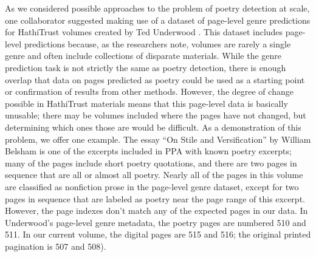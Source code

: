 \documentclass{anthology-ch}         %
\begin{document}
As we considered possible approaches to the problem of poetry detection at scale, one collaborator suggested making use of a dataset of page-level genre predictions for HathiTrust volumes created by Ted Underwood \cite{underwood_page-level_2014}. This dataset includes page-level predictions because, as the researchers note, volumes are rarely a single genre and often include collections of disparate materials. While the genre prediction task is not strictly the same as poetry detection, there is enough overlap that data on pages predicted as poetry could be used as a starting point or confirmation of results from other methods. However, the degree of change possible in HathiTrust materials means that this page-level data is basically unusable; there may be volumes included where the pages have not changed, but determining which ones those are would be difficult. As a demonstration of this problem, we offer one example. The essay “On Stile and Versification” by William Belsham\cite{belsham_stile_1799} is one of the excerpts included in PPA with known poetry excerpts; many of the pages include short poetry quotations, and there are two pages in sequence that are all or almost all poetry. Nearly all of the pages in this volume are classified as nonfiction prose in the page-level genre dataset, except for two pages in sequence that are labeled as poetry near the page range of this excerpt. However, the page indexes don’t match any of the expected pages in our data. In Underwood’s page-level genre metadata, the poetry pages are numbered 510 and 511. In our current volume, the digital pages are 515 and 516; the original printed pagination is 507 and 508).
\end{document}
